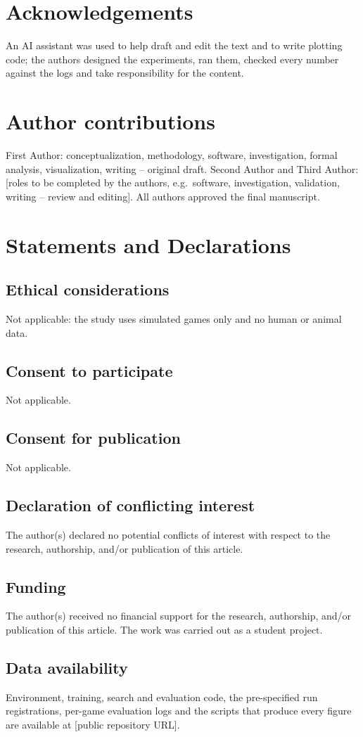 \documentclass[11pt]{article}
\begin{document}
\section*{Acknowledgements}
An AI assistant was used to help draft and edit the text and to write plotting code; the authors designed the experiments, ran them, checked every number against the logs and take responsibility for the content.

\section*{Author contributions}
First Author: conceptualization, methodology, software, investigation, formal analysis, visualization, writing -- original draft. Second Author and Third Author: [roles to be completed by the authors, e.g.\ software, investigation, validation, writing -- review and editing]. All authors approved the final manuscript.

\section*{Statements and Declarations}
\subsection*{Ethical considerations}
Not applicable: the study uses simulated games only and no human or animal data.
\subsection*{Consent to participate}
Not applicable.
\subsection*{Consent for publication}
Not applicable.
\subsection*{Declaration of conflicting interest}
The author(s) declared no potential conflicts of interest with respect to the research, authorship, and/or publication of this article.
\subsection*{Funding}
The author(s) received no financial support for the research, authorship, and/or publication of this article. The work was carried out as a student project.
\subsection*{Data availability}
Environment, training, search and evaluation code, the pre-specified run registrations, per-game evaluation logs and the scripts that produce every figure are available at [public repository URL].
\end{document}
